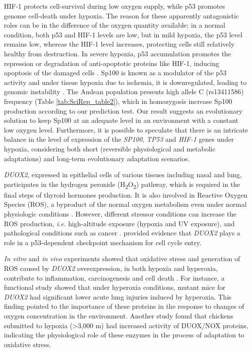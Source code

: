 HIF-1 protects cell-survival during low oxygen supply, while p53 promotes genome cell-death under hypoxia. The reason for these apparently antagonistic roles can be in the difference of the oxygen quantity available; in a normal condition, both p53 and HIF-1 levels are low, but in mild hypoxia, the p53 level remains low, whereas the HIF-1 level increases, protecting cells still relatively healthy from destruction. In severe hypoxia, p53 accumulation promotes the repression or degradation of anti-apoptotic proteins like HIF-1, inducing apoptosis of the damaged cells \cite{schmid_hif-1_2004,obacz_cross-talk_2013,zhou_modeling_2015}. Sp100 is known as a modulator of the p53 activity \cite{berscheminski_sp100a_2016} and under tissue hypoxia due to ischemia, it is downregulated, leading to genomic instability \cite{herrer_gene_2015}. The Andean population presents high allele C (rs13411586) frequency (Table \ref{tab:SciRep_table2}), which in homozygosis increase Sp100 production according to our prediction test. Our result suggests an evolutionary solution to keep Sp100 at an adequate level in an environment with a constant low oxygen level. Furthermore, it is possible to speculate that there is an intricate balance in the level of expression of the \textsl{SP100}, \textsl{TP53} and \textsl{HIF-1} genes under hypoxia, considering both short (reversible physiological and metabolic adaptations) and long-term evolutionary adaptation scenarios.

\textsl{DUOX2}, expressed in epithelial cells of various tissues including nasal and lung, participates in the hydrogen peroxide (H\textsubscript{2}O\textsubscript{2}) pathway, which is required in the final steps of thyroid hormones production. It is also involved in Reactive Oxygen Species (ROS), a byproduct of the normal oxygen metabolism even under normal physiologic conditions \cite{devasagayam_free_2004}. However, different stressor conditions can increase the ROS production, \emph{i.e.} high-altitude exposure (hypoxia and UV exposure), and pathological conditions such as cancer \cite{gupta_upsides_2012}.  provided evidence that \textsl{DUOX2} plays a role in a p53-dependent checkpoint mechanism for cell cycle entry.

\textit{In vitro} and \textit{in vivo} experiments showed that oxidative stress and generation of ROS caused by \textsl{DUOX2} overexpression, in both hypoxia and hyperoxia, contribute to inflammation, carcinogenesis and cell death \cite{kim_dual_2014,bautista-ortega_supplemental_2014,fletcher_nicotinamide_2014,dias-freitas_molecular_2016,min_ros-dependent_2017,lin_high_2017,macfie_duox2_2014}. For instance, a functional study \cite{kim_dual_2014} showed that under hyperoxia conditions, mutant mice for \textsl{DUOX2} had significant lower acute lung injuries induced by hyperoxia. This finding pointed to the importance of these proteins in the response to changes of oxygen concentration in the environment. Another study \cite{bautista-ortega_supplemental_2014} found that chickens submitted to hypoxia (>3,000 m) had increased activity of DUOX/NOX proteins, indicating the physiological role of these enzymes in the process of adaptation to oxidative stress.

